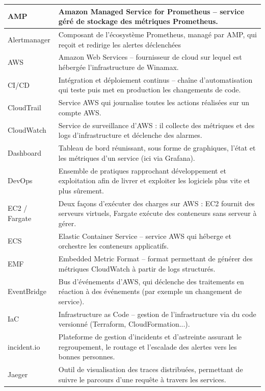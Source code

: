 \begin{longtable}{|p{}|p{}|}
		AMP & Amazon Managed Service for Prometheus -- service géré de stockage des métriques Prometheus. \\
		\hline
		Alertmanager & Composant de l'écosystème Prometheus, managé par AMP, qui reçoit et redirige les alertes déclenchées \\
		\hline
		AWS & Amazon Web Services -- fournisseur de cloud sur lequel est hébergée l'infrastructure de Winamax. \\
		\hline
		CI/CD & Intégration et déploiement continus -- chaîne d'automatisation qui teste puis met en production les changements de code. \\
		\hline
		CloudTrail & Service AWS qui journalise toutes les actions réalisées sur un compte AWS. \\
		\hline
		CloudWatch & Service de surveillance d'AWS : il collecte des métriques et des logs d'infrastructure et déclenche des alarmes. \\
		\hline
		Dashboard & Tableau de bord réunissant, sous forme de graphiques, l'état et les métriques d'un service (ici via Grafana). \\
		\hline
		DevOps & Ensemble de pratiques rapprochant développement et exploitation afin de livrer et exploiter les logiciels plus vite et plus sûrement. \\
		\hline
		EC2 / Fargate & Deux façons d'exécuter des charges sur AWS : EC2 fournit des serveurs virtuels, Fargate exécute des conteneurs sans serveur à gérer. \\
		\hline
		ECS & Elastic Container Service -- service AWS qui héberge et orchestre les conteneurs applicatifs. \\
		\hline
		EMF & Embedded Metric Format -- format permettant de générer des métriques CloudWatch à partir de logs structurés. \\
		\hline
		EventBridge & Bus d'événements d'AWS, qui déclenche des traitements en réaction à des événements (par exemple un changement de service). \\
		\hline
		IaC & Infrastructure as Code -- gestion de l'infrastructure via du code versionné (Terraform, CloudFormation...). \\
		\hline
		incident.io & Plateforme de gestion d'incidents et d'astreinte assurant le regroupement, le routage et l'escalade des alertes vers les bonnes personnes. \\
		\hline
		Jaeger & Outil de visualisation des traces distribuées, permettant de suivre le parcours d'une requête à travers les services. \\

\end{longtable}
